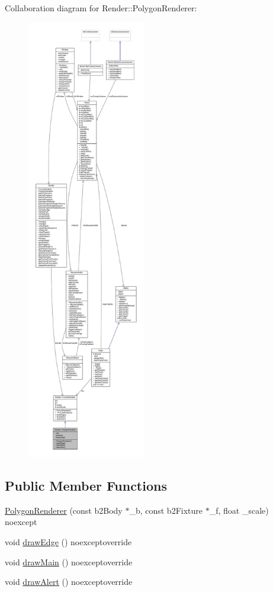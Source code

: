 Collaboration diagram for Render\+:\+:Polygon\+Renderer\+:
\nopagebreak
\begin{figure}[H]
\begin{center}
\leavevmode
\includegraphics[height=550pt]{classRender_1_1PolygonRenderer__coll__graph}
\end{center}
\end{figure}
\subsection*{Public Member Functions}
\begin{DoxyCompactItemize}
\item 
\hyperlink{classRender_1_1PolygonRenderer_a838a3a8cf080315b7524b0b55dfcf9bc}{Polygon\+Renderer} (const b2\+Body $\ast$\+\_\+b, const b2\+Fixture $\ast$\+\_\+f, float \+\_\+scale) noexcept
\item 
void \hyperlink{classRender_1_1PolygonRenderer_af3e5d487898b3f7e0da7edcfc59967ba}{draw\+Edge} () noexceptoverride
\item 
void \hyperlink{classRender_1_1PolygonRenderer_aec84603818d0ce8ba1805c4828505578}{draw\+Main} () noexceptoverride
\item 
void \hyperlink{classRender_1_1PolygonRenderer_ade951f9c8f1034823aecab89fe06aa9c}{draw\+Alert} () noexceptoverride
\end{DoxyCompactItemize}
